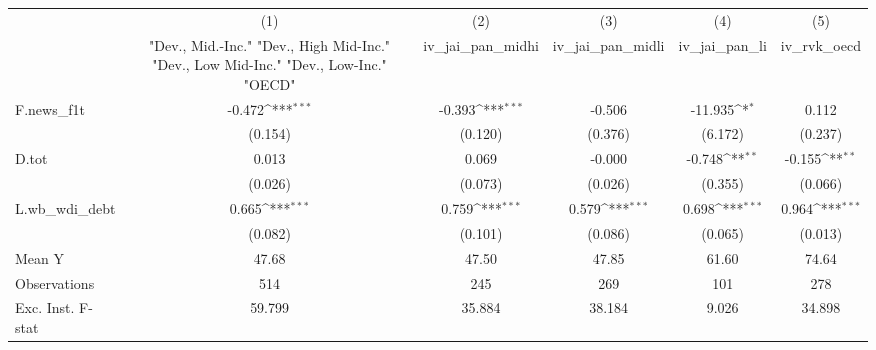 {
\def\sym#1{\ifmmode^{#1}\else\(^{#1}\)\fi}
\begin{tabular}{l*{5}{c}}
\toprule
            &\multicolumn{1}{c}{(1)}&\multicolumn{1}{c}{(2)}&\multicolumn{1}{c}{(3)}&\multicolumn{1}{c}{(4)}&\multicolumn{1}{c}{(5)}\\
            &\multicolumn{1}{c}{ "Dev., Mid.-Inc." "Dev., High Mid-Inc." "Dev., Low Mid-Inc." "Dev., Low-Inc." "OECD" }&\multicolumn{1}{c}{iv\_jai\_pan\_midhi}&\multicolumn{1}{c}{iv\_jai\_pan\_midli}&\multicolumn{1}{c}{iv\_jai\_pan\_li}&\multicolumn{1}{c}{iv\_rvk\_oecd}\\
\midrule
F.news\_f1t  &      -0.472\sym{***}&      -0.393\sym{***}&      -0.506         &     -11.935\sym{*}  &       0.112         \\
            &     (0.154)         &     (0.120)         &     (0.376)         &     (6.172)         &     (0.237)         \\
\addlinespace
D.tot       &       0.013         &       0.069         &      -0.000         &      -0.748\sym{**} &      -0.155\sym{**} \\
            &     (0.026)         &     (0.073)         &     (0.026)         &     (0.355)         &     (0.066)         \\
\addlinespace
L.wb\_wdi\_debt&       0.665\sym{***}&       0.759\sym{***}&       0.579\sym{***}&       0.698\sym{***}&       0.964\sym{***}\\
            &     (0.082)         &     (0.101)         &     (0.086)         &     (0.065)         &     (0.013)         \\
\midrule
Mean Y      &       47.68         &       47.50         &       47.85         &       61.60         &       74.64         \\
Observations&         514         &         245         &         269         &         101         &         278         \\
Exc. Inst. F-stat&      59.799         &      35.884         &      38.184         &       9.026         &      34.898         \\
\bottomrule
\end{tabular}
}

